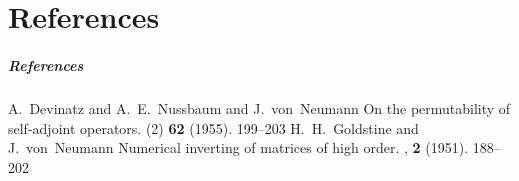 \documentclass[
compress]
{beamer}
\begin{document}
\part{References}
\frame{\partpage}

\begin{frame}
\frametitle<presentation>{References}  
  \begin{thebibliography}{10}
  \beamertemplatearticlebibitems
    A.~Devinatz and A.~E.~Nussbaum and J.~von~Neumann
    \newblock On the permutability of self-adjoint operators.
     (2) {\bf 62} (1955). 199--203
    \pause
    H.~H.~Goldstine and J.~von~Neumann
    \newblock Numerical inverting of matrices of high order.
    , {\bf 2} (1951). 188--202
\pause
  \end{thebibliography}
\end{frame}
\end{document}
